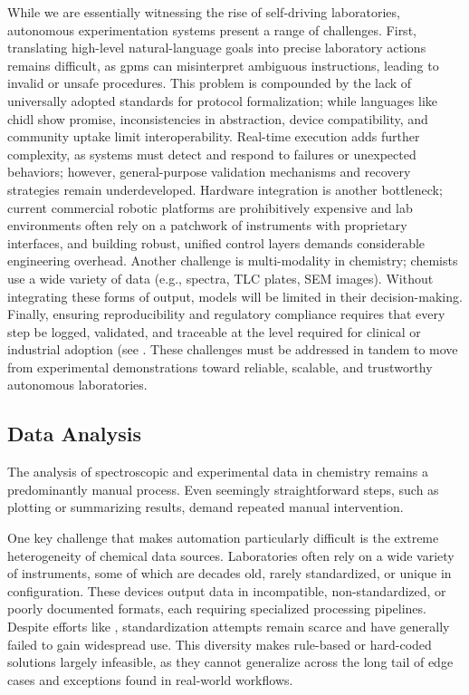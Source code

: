 While we are essentially witnessing the rise of self-driving laboratories, autonomous experimentation systems present a range of challenges.\autocite{Tom2024SDL,Seifrid2022SDL} 
First, translating high-level natural-language goals into precise laboratory actions remains difficult, as \glspl{gpm} can misinterpret ambiguous instructions, leading to invalid or unsafe procedures. 
This problem is compounded by the lack of universally adopted standards for protocol formalization; while languages like \gls{chidl} show promise, inconsistencies in abstraction, device compatibility, and community uptake limit interoperability. 
Real-time execution adds further complexity, as systems must detect and respond to failures or unexpected behaviors; however, general-purpose validation mechanisms and recovery strategies remain underdeveloped. 
Hardware integration is another bottleneck; current commercial robotic platforms are prohibitively expensive and lab environments often rely on a patchwork of instruments with proprietary interfaces, and building robust, unified control layers demands considerable engineering overhead. 
Another challenge is multi-modality in chemistry; chemists use a wide variety of data (e.g., spectra, TLC plates, SEM images). 
Without integrating these forms of output, models will be limited in their decision-making. 
Finally, ensuring reproducibility and regulatory compliance requires that every step be logged, validated, and traceable at the level required for clinical or industrial adoption (see . These challenges must be addressed in tandem to move from experimental demonstrations toward reliable, scalable, and trustworthy autonomous laboratories.


\subsection{Data Analysis}
The analysis of spectroscopic and experimental data in chemistry remains a predominantly manual process. 
Even seemingly straightforward steps, such as plotting or summarizing results, demand repeated manual intervention.

One key challenge that makes automation particularly difficult is the extreme heterogeneity of chemical data sources. 
Laboratories often rely on a wide variety of instruments, some of which are decades old, rarely standardized, or unique in configuration.\autocite{jablonka2022making} 
These devices output data in incompatible, non-standardized, or poorly documented formats, each requiring specialized processing pipelines. 
Despite efforts like  \autocite{McDonald1988standard}, standardization attempts remain scarce and have generally failed to gain widespread use. 
This diversity makes rule-based or hard-coded solutions largely infeasible, as they cannot generalize across the long tail of edge cases and exceptions found in real-world workflows.

